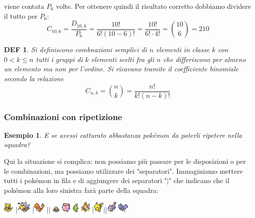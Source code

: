 \documentclass{article}     %
\newtheorem*{definition}{DEF}
\newtheorem{ex}{Esempio}[section]
\begin{document}
            viene contata $P_6$ volte. Per ottenere quindi il risultato corretto dobbiamo dividere il tutto per $P_6$:
            \[C_{10,6}=\frac{D_{10,6}}{P_6}=\frac{10!}{6!(10-6)!}=\frac{10!}{6!\cdot4!}=\binom{10}{6}=210\]
            \begin{definition}
                Si definiscono combnazioni semplici di $n$ elementi in classe $k$ con $0<k\leq n$ tutti i gruppi di $k$ elementi scelti fra gli $n$ che differiscono per almeno un elemento ma non per l'ordine. Si ricavano tramite il coefficiente binomiale secondo la relazione \[C_{n,k}=\binom{n}{k}=\frac{n!}{k!(n-k)!}\]
            \end{definition}
        \subsubsection{Combinazioni con ripetizione}
            \begin{ex}
                E se avessi catturato abbastanza pokémon da poterli ripetere nella squadra?
                
            \end{ex}
            Qui la situazione si complica: non possiamo più passare per le disposizioni o per le combinazioni, ma possiamo utilizzare dei "separatori". Immaginiamo mettere tutti i pokémon in fila e di aggiungere dei separatori "$|$" che indicano che il pokémon alla loro sinistra farà parte della squadra: 
            \begin{center}
                \includegraphics{pkmn/A.png} $|$\includegraphics{pkmn/B.png} $|$\includegraphics{pkmn/C.png} $|$$|$ \includegraphics{pkmn/D.png} \includegraphics{pkmn/J.png} \includegraphics{pkmn/M.png} \includegraphics{pkmn/MK.png} $|$\includegraphics{pkmn/P.png}$|$$|$\includegraphics{pkmn/R.png} \includegraphics{pkmn/Z.png}
            \end{center} 
\end{document}
